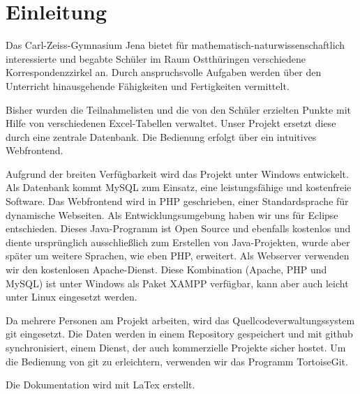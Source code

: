 \chapter{Einleitung}
Das Carl-Zeiss-Gymnasium Jena bietet für mathematisch-naturwissenschaftlich interessierte und begabte Schüler im Raum Ostthüringen verschiedene Korrespondenzzirkel an. Durch anspruchsvolle Aufgaben werden über den Unterricht hinausgehende Fähigkeiten und Fertigkeiten vermittelt.

Bisher wurden die Teilnahmelisten und die von den Schüler erzielten Punkte mit Hilfe von verschiedenen Excel-Tabellen verwaltet. Unser Projekt ersetzt diese durch eine zentrale Datenbank. Die Bedienung erfolgt über ein intuitives Webfrontend. 

Aufgrund der breiten Verfügbarkeit wird das Projekt unter Windows entwickelt. Als Datenbank kommt MySQL zum Einsatz, eine leistungsfähige und kostenfreie Software. Das Webfrontend wird in PHP geschrieben, einer Standardsprache für dynamische Webseiten. Als Entwicklungsumgebung haben wir uns für Eclipse entschieden. Dieses Java-Programm ist Open Source und ebenfalls kostenlos und diente ursprünglich ausschließlich zum Erstellen von Java-Projekten, wurde aber später um weitere Sprachen, wie eben PHP, erweitert. Als Webserver verwenden wir den kostenlosen Apache-Dienst. Diese Kombination (Apache, PHP und MySQL) ist unter Windows als Paket XAMPP verfügbar, kann aber auch leicht unter Linux eingesetzt werden.

Da mehrere Personen am Projekt arbeiten, wird das Quellcodeverwaltungssystem git eingesetzt. Die Daten werden in einem Repository gespeichert und mit github synchronisiert, einem Dienst, der auch kommerzielle Projekte sicher hostet. Um die Bedienung von git zu erleichtern, verwenden wir das Programm TortoiseGit.

Die Dokumentation wird mit LaTex erstellt.
